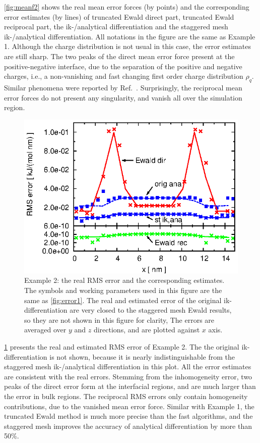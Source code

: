 \documentclass[journal=jacsat,manuscript=article]{achemso}
\newcommand{\redc}[1]{{\color{black} #1}}
\begin{document}
\ref{fig:meanf2} shows the real mean error forces (by points) and the
corresponding error estimates (by lines) of \redc{truncated} Ewald direct
part, truncated Ewald reciprocal part, the ik-/analytical
differentiation 
and the staggered mesh ik-/analytical differentiation. All
notations in the figure are the same as Example 1.  Although the
charge distribution is not usual in this case, the error estimates are still
sharp. The two peaks of the direct mean  error force present at the
positive-negative interface, due to the separation of the positive
and negative charges, i.e., a non-vanishing and fast changing first order charge
distribution $\rho_q$.  Similar phenomena \redc{were} reported by
Ref.~\cite{wang2012}. Surprisingly, 
the reciprocal mean error forces
do not present any singularity, and vanish
all over the simulation region.

\begin{figure}
  \centering
  \includegraphics[]{fig.rand2.error.eps}
  \caption{
    Example 2: the real RMS error and the corresponding
    estimates.
    The symbols and working parameters used in this figure are the same as
    \ref{fig:error1}.
    The real and estimated error of the original ik-differentiation
    are very closed to the staggered mesh Ewald results, so
    they are not shown in this figure for clarity, 
    The errors are averaged over $y$ and $z$ directions, and are
    plotted against $x$ axis.
  }
  \label{fig:error2}
\end{figure}

\ref{fig:error2} presents the real and estimated
RMS error of Example 2. The
the original ik-differentiation is not
shown, because it is nearly indistinguishable from the staggered
mesh ik-/analytical differentiation in this plot.
All the error estimates \redc{are consistent with} the real errors.
Stemming from the inhomogeneity error,
two peaks of the direct error form at the interfacial
regions, and are much larger than the error in bulk
regions.
The reciprocal RMS errors only contain homogeneity contributions,
due to the vanished mean error force.
Similar with Example 1, the truncated Ewald
method is much more precise than the fast algorithms, and the
staggered mesh improves the accuracy of analytical
differentiation by more than 50\%.
\end{document}

